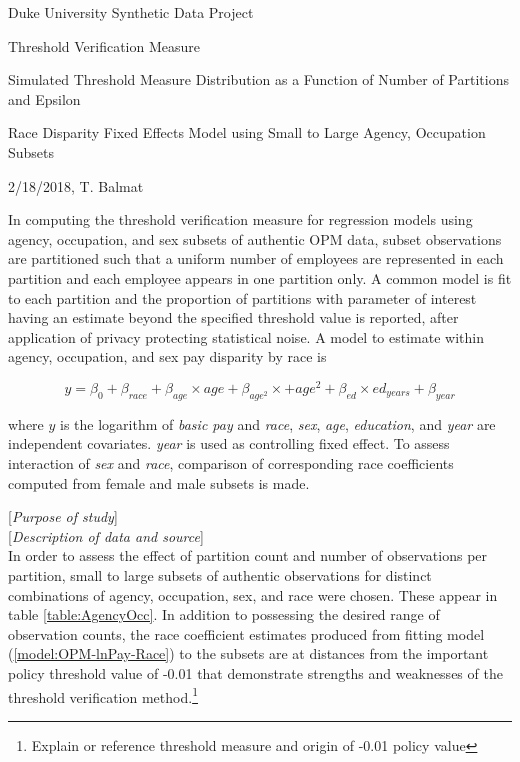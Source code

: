 \documentclass[10pt, letterpaper]{article}
\begin{document}
\begin{spacing}{1.0}

Duke University Synthetic Data Project
    
Threshold Verification Measure

Simulated Threshold Measure Distribution as a Function of Number of Partitions and Epsilon

Race Disparity Fixed Effects Model using Small to Large Agency, Occupation Subsets

2/18/2018, T. Balmat

\vspace{20pt}

In computing the threshold verification measure for regression models using agency, occupation, and sex subsets of authentic OPM data, subset observations are partitioned such that a uniform number of employees are represented in each partition and each employee appears in one partition only.  A common model is fit to each partition and the proportion of partitions with parameter of interest having an estimate beyond the specified threshold value is reported, after application of privacy protecting statistical noise.  A model to estimate within agency, occupation, and sex pay disparity by race is

\vspace{-24pt}
\begin{center}
    \begin{equation}
    y=\beta_0 + \beta_{race} + \beta_{age} \times age + \beta_{age^2} \times + age^2 + \beta_{ed} \times ed_{years} + \beta_{year}
    \label{model:OPM-lnPay-Race}
    \end{equation}
\end{center}

where $y$ is the logarithm of \textit{basic pay} and \textit{race}, \textit{sex}, \textit{age}, \textit{education}, and \textit{year} are independent covariates.  \textit{year} is used as controlling fixed effect.  To assess interaction of \textit{sex} and \textit{race}, comparison of corresponding race coefficients computed from female and male subsets is made. 

\vspace{12pt}

[\textit{Purpose of study}]\\

[\textit{Description of data and source}]\\

In order to assess the effect of partition count and number of observations per partition, small to large subsets of authentic observations for distinct combinations of agency, occupation, sex, and race were chosen.  These appear in table \ref{table:AgencyOcc}.  In addition to possessing the desired range of observation counts, the race coefficient estimates produced from fitting model (\ref{model:OPM-lnPay-Race}) to the subsets are at distances from the important policy threshold value of -0.01 that demonstrate strengths and weaknesses of the threshold verification method.\footnote{Explain or reference threshold measure and origin of -0.01 policy value}


\end{spacing}
\end{document}
